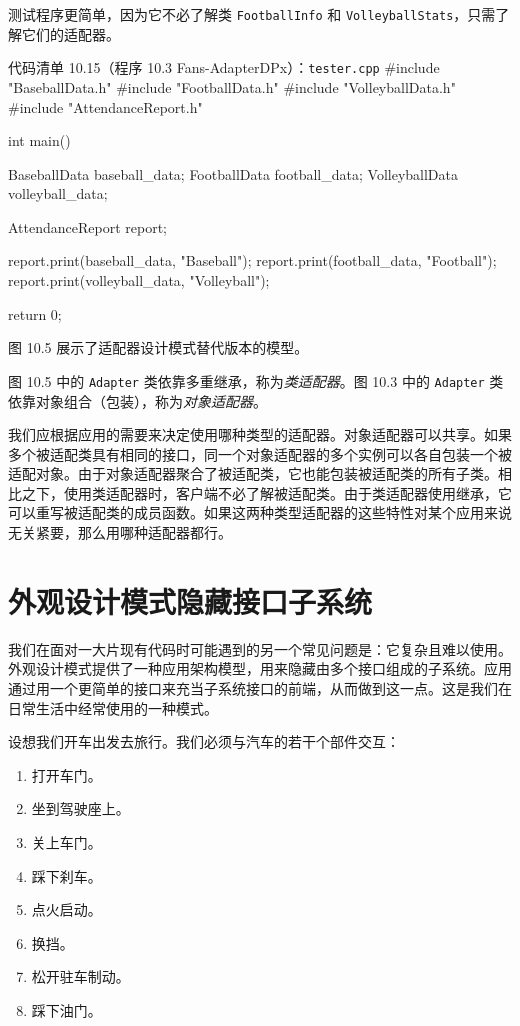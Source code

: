 测试程序更简单，因为它不必了解类 \texttt{Football\allowbreak{}Info} 和 \texttt{Volleyball\allowbreak{}Stats}，只需了解它们的适配器。

\begin{codeboxt}{代码清单 10.15（程序 10.3 Fans-AdapterDPx）：\texttt{tester.\allowbreak{}cpp}}
#include "BaseballData.h"
#include "FootballData.h"
#include "VolleyballData.h"
#include "AttendanceReport.h"

int main()
{
    BaseballData   baseball_data;
    FootballData   football_data;
    VolleyballData volleyball_data;

    AttendanceReport report;

    report.print(baseball_data,   "Baseball");
    report.print(football_data,   "Football");
    report.print(volleyball_data, "Volleyball");

    return 0;
}
\end{codeboxt}

图 10.5 展示了适配器设计模式替代版本的模型。


图 10.5 中的 \texttt{Adapter} 类依靠多重继承，称为\emph{类适配器}。图 10.3 中的 \texttt{Adapter} 类依靠对象组合（包装），称为\emph{对象适配器}。


我们应根据应用的需要来决定使用哪种类型的适配器。对象适配器可以共享。如果多个被适配类具有相同的接口，同一个对象适配器的多个实例可以各自包装一个被适配对象。由于对象适配器聚合了被适配类，它也能包装被适配类的所有子类。相比之下，使用类适配器时，客户端不必了解被适配类。由于类适配器使用继承，它可以重写被适配类的成员函数。如果这两种类型适配器的这些特性对某个应用来说无关紧要，那么用哪种适配器都行。

\section{外观设计模式隐藏接口子系统}

我们在面对一大片现有代码时可能遇到的另一个常见问题是：它复杂且难以使用。外观设计模式提供了一种应用架构模型，用来隐藏由多个接口组成的子系统。应用通过用一个更简单的接口来充当子系统接口的前端，从而做到这一点。这是我们在日常生活中经常使用的一种模式。

设想我们开车出发去旅行。我们必须与汽车的若干个部件交互：

\begin{enumerate}
\item 打开车门。
\item 坐到驾驶座上。
\item 关上车门。
\item 踩下刹车。
\item 点火启动。
\item 换挡。
\item 松开驻车制动。
\item 踩下油门。
\end{enumerate}

